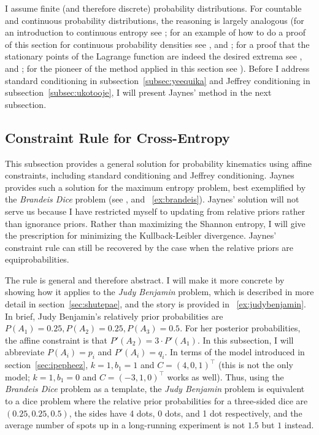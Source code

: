 \documentclass[phd,12pt,oneside]{ubcthesis}
\begin{document}
I assume finite (and therefore discrete) probability distributions.
For countable and continuous probability distributions, the reasoning
is largely analogous (for an introduction to continuous entropy see
; for an example of how to do a proof of this
section for continuous probability densities see
, and ; for a proof
that the stationary points of the Lagrange function are indeed the
desired extrema see , and
; for the pioneer of the method applied
in this section see ). Before I address
standard conditioning in subsection~\ref{subsec:yeequika} and 
Jeffrey conditioning in subsection~\ref{subsec:ukotooje}, I will
present Jaynes' method in the next subsection.

\subsection{Constraint Rule for Cross-Entropy}
\label{subsec:choiwohk}

This subsection provides a general solution for probability kinematics
using affine constraints, including standard conditioning and Jeffrey
conditioning. Jaynes provides such a solution for the maximum entropy
problem, best exemplified by the \emph{Brandeis Dice} problem (see
, and {\xample}~\ref{ex:brandeis}). Jaynes'
solution will not serve us because I have restricted myself to
updating from relative priors rather than ignorance priors. Rather
than maximizing the Shannon entropy, I will give the prescription for
minimizing the Kullback-Leibler divergence. Jaynes' constraint rule can
still be recovered by the case when the relative priors are
equiprobabilities.

The rule is general and therefore abstract. I will make it more
concrete by showing how it applies to the \emph{Judy Benjamin}
problem, which is described in more detail in
section~\ref{sec:shutepae}, and the story is provided in
{\xample}~\ref{ex:judybenjamin}. In brief, Judy Benjamin's relatively
prior probabilities are $P(A_{1})=0.25,P(A_{2})=0.25,P(A_{3})=0.5$.
For her posterior probabilities, the affine constraint is that
$P'(A_{2})=3\cdot{}P'(A_{1})$. In this subsection, I will abbreviate
$P(A_{i})=p_{i}$ and $P'(A_{i})=q_{i}$. In terms of the model
introduced in section~\ref{sec:ipepheez}, $k=1,b_{1}=1$ and
$C=(4,0,1)^{\intercal}$ (this is not the only model; $k=1,b_{1}=0$ and
$C=(-3,1,0)^{\intercal}$ works as well). Thus, using the
\emph{Brandeis Dice} problem as a template, the \emph{Judy Benjamin}
problem is equivalent to a dice problem where the relative prior
probabilities for a three-sided dice are $(0.25,0.25,0.5)$, the sides
have 4 dots, 0 dots, and 1 dot respectively, and the average number of
spots up in a long-running experiment is not $1.5$ but $1$ instead.
\end{document}
